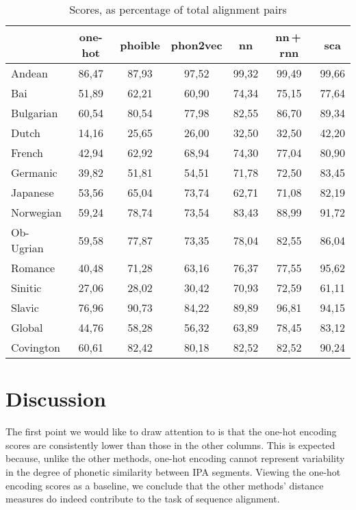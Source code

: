 \documentclass[a4paper]{report}
\begin{document}
\begin{table}[h]
	\centering\small
	\begin{tabular}{l *{6}{c}}
		\toprule
		& one-hot & phoible & phon2vec & nn & nn\,+\,rnn & sca \\
		\midrule
		Andean		&	86,47 &	87,93 &	97,52 &	99,32 &	99,49 & 99,66 \\
		Bai			&	51,89 &	62,21 &	60,90 &	74,34 &	75,15 & 77,64 \\
		Bulgarian	&	60,54 &	80,54 &	77,98 &	82,55 &	86,70 & 89,34 \\
		Dutch		&	14,16 &	25,65 &	26,00 &	32,50 &	32,50 & 42,20 \\
		French		&	42,94 &	62,92 &	68,94 &	74,30 &	77,04 & 80,90 \\
		Germanic	&	39,82 &	51,81 &	54,51 &	71,78 &	72,50 & 83,45 \\
		Japanese	&	53,56 &	65,04 &	73,74 &	62,71 &	71,08 & 82,19 \\
		Norwegian	&	59,24 &	78,74 &	73,54 &	83,43 &	88,99 & 91,72 \\
		Ob-Ugrian	&	59,58 &	77,87 &	73,35 &	78,04 &	82,55 & 86,04 \\
		Romance		&	40,48 &	71,28 &	63,16 &	76,37 &	77,55 & 95,62 \\
		Sinitic		&	27,06 &	28,02 &	30,42 &	70,93 &	72,59 & 61,11 \\
		Slavic		&	76,96 &	90,73 &	84,22 &	89,89 &	96,81 & 94,15 \\
		\addlinespace
		Global		&	44,76 &	58,28 &	56,32 &	63,89 &	78,45 & 83,12 \\
		Covington	&	60,61 &	82,42 &	80,18 &	82,52 &	82,52 & 90,24 \\
		\bottomrule
	\end{tabular}
	\caption{Scores, as percentage of total alignment pairs}
	\label{tab:results}
\end{table}


\section{Discussion}

The first point we would like to draw attention to is that the one-hot encoding scores are consistently lower than those in the other columns.
This is expected because, unlike the other methods, one-hot encoding cannot represent variability in the degree of phonetic similarity between IPA segments.
Viewing the one-hot encoding scores as a baseline, we conclude that the other methods' distance measures do indeed contribute to the task of sequence alignment.
\end{document}
